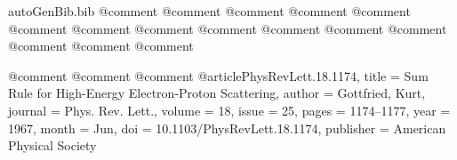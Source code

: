 \begin{filecontents*}{autoGenBib.bib}
@comment %
@comment %
@comment %
@comment %
@comment %
@comment %
@comment %
@comment %
@comment %
@comment %
@comment %
@comment %
@comment %
@comment %
@comment %

@comment %
@comment %
@comment %
@article{PhysRevLett.18.1174,
  title = {Sum Rule for High-Energy Electron-Proton Scattering},
  author = {Gottfried, Kurt},
  journal = {Phys. Rev. Lett.},
  volume = {18},
  issue = {25},
  pages = {1174--1177},
  year = {1967},
  month = {Jun},
  doi = {10.1103/PhysRevLett.18.1174},
  publisher = {American Physical Society}
}


\end{filecontents*}
